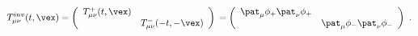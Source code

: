 \begin{equation}
  T^{inv}_{\mu\nu}(t,\vex) = \left( \begin{array}{cc}
  T^+_{\mu\nu} (t,\vex) & \mbox{} \\ \mbox{} & T^-_{\mu\nu} (-t,-\vex)
  \end{array} \right) %
\mbox{} = \left( \begin{array}{cc}
  \pat_\mu \phi_+ \pat_\nu \phi_+ & \mbox{} \\ \mbox{} &
  \pat_\mu \phi_- \pat_\nu \phi_-
  \end{array} \right) \ .
\end{equation}

